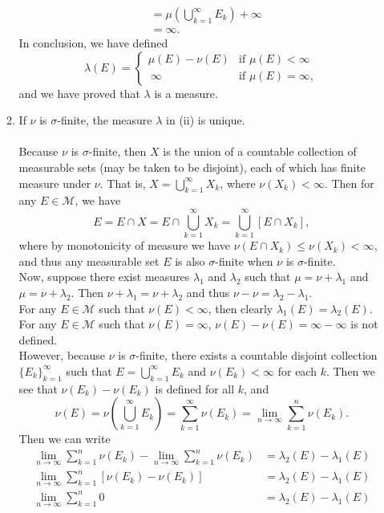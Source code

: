 \begin{enumerate}
\begin{enumerate}[label=(\roman*),align=left]
\begin{align*}
			&=\mu\left(\bigcup_{k=1}^\infty E_k\right)+\infty\\
			&=\infty.
		\end{align*}
		In conclusion, we have defined
		\[
		\lambda(E)=
		\begin{cases}
			\mu(E)-\nu(E)&\text{if }\mu(E)<\infty\\\
			\infty&\text{if }\mu(E)=\infty,
		\end{cases}
		\]
		and we have proved that $\lambda$ is a measure.
		\item If $\nu$ is $\sigma$-finite, the measure $\lambda$ in (ii) is unique.\\
		\\Because $\nu$ is $\sigma$-finite, then $X$ is the union of a countable collection of measurable sets (may be taken to be disjoint), each of which has finite measure under $\nu$.
		That is, $X=\bigcup_{k=1}^\infty X_k$, where $\nu(X_k)<\infty$.
		Then for any $E\in\mathcal{M}$, we have 
		\[
			E=E\cap X = E\cap \bigcup_{k=1}^\infty X_k = \bigcup_{k=1}^\infty[E\cap X_k],
		\]
		where by monotonicity of measure we have $\nu(E\cap X_k)\le\nu(X_k)<\infty$, and thus any measurable set $E$ is also $\sigma$-finite when $\nu$ is $\sigma$-finite.
		\\Now, suppose there exist measures $\lambda_1$ and $\lambda_2$ such that $\mu=\nu+\lambda_1$ and $\mu=\nu+\lambda_2$.
		Then $\nu+\lambda_1=\nu+\lambda_2$ and thus $\nu-\nu=\lambda_2-\lambda_1$.
		\\For any $E\in\mathcal{M}$ such that $\nu(E)<\infty$, then clearly $\lambda_1(E)=\lambda_2(E)$.
		\\For any $E\in\mathcal{M}$ such that $\nu(E)=\infty$, $\nu(E)-\nu(E)=\infty-\infty$ is not defined. 
		\\However, because $\nu$ is $\sigma$-finite, there exists a countable disjoint collection $\{E_k\}_{k=1}^\infty$ such that $E=\bigcup_{k=1}^\infty E_k$ and $\nu(E_k)<\infty$ for each $k$. 
		Then we see that $\nu(E_k)-\nu(E_k)$ is defined for all $k$, and
		\[
			\nu(E)=\nu(\bigcup_{k=1}^\infty E_k)=\sum_{k=1}^\infty \nu(E_k)=\lim_{n\to\infty}\sum_{k=1}^n \nu(E_k).
		\] 
		Then we can write 
		\begin{align*}
			\lim_{n\to\infty}\sum_{k=1}^n \nu(E_k)-\lim_{n\to\infty}\sum_{k=1}^n \nu(E_k)&=\lambda_2(E)-\lambda_1(E)\\
			\lim_{n\to\infty}\sum_{k=1}^n [\nu(E_k)-\nu(E_k)]&=\lambda_2(E)-\lambda_1(E)\\
			\lim_{n\to\infty}\sum_{k=1}^n 0&=\lambda_2(E)-\lambda_1(E)\\

\end{align*}
\end{enumerate}
\end{enumerate}
